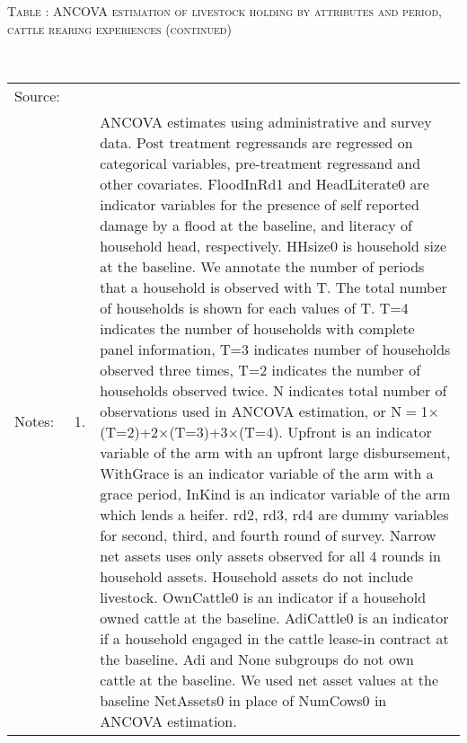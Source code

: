 \addtocounter{table}{-1}
\hspace{-1cm}\begin{minipage}[t]{14cm}
\hfil\textsc{\normalsize Table \thetable: ANCOVA estimation of livestock holding by attributes and period, cattle rearing experiences (continued)\label{tab ANCOVA livestock holding Experience timevarying attributes 2}}\\
\setlength{\tabcolsep}{1pt}
\setlength{\baselineskip}{8pt}
\renewcommand{\arraystretch}{.52}
\hfil{}\\
\renewcommand{\arraystretch}{.8}
\setlength{\tabcolsep}{1pt}
\begin{tabular}{>{\hfill\scriptsize}p{1cm}<{}>{\hfill\scriptsize}p{.25cm}<{}>{\scriptsize}p{12cm}<{\hfill}}
Source:& \multicolumn{2}{l}{\scriptsize Estimated with GUK administrative and survey data.}\\
Notes: & 1. & ANCOVA estimates using administrative and survey data. Post treatment regressands are regressed on categorical variables, pre-treatment regressand and other covariates. \textsf{FloodInRd1} and \textsf{HeadLiterate0} are indicator variables for the presence of self reported damage by a flood at the baseline, and literacy of household head, respectively. \textsf{HHsize0} is household size at the baseline. We annotate the number of periods that a household is observed with \textsf{T}. The total number of households is shown for each values of \textsf{T}. \textsf{T=4} indicates the number of households with complete panel information, \textsf{T=3} indicates number of households observed three times, \textsf{T=2} indicates the number of households observed twice. \textsf{N} indicates total number of observations used in ANCOVA estimation, or \textsf{N$=$1$\times$(T=2)+2$\times$(T=3)+3$\times$(T=4)}.  \textsf{Upfront} is an indicator variable of the arm with an upfront large disbursement, \textsf{WithGrace} is an indicator variable of the arm with a grace period, \textsf{InKind} is an indicator variable of the arm which lends a heifer. \textsf{rd2, rd3, rd4} are dummy variables for second, third, and fourth round of survey. Narrow net assets uses only assets observed for all 4 rounds in household assets. Household assets do not include livestock. \textsf{OwnCattle0} is an indicator if a household owned cattle at the baseline. \textsf{AdiCattle0} is an indicator if a household engaged in the cattle lease-in contract at the baseline.  \textsf{Adi} and \textsf{None} subgroups do not own cattle at the baseline. We used net asset values at the baseline \textsf{NetAssets0} in place of \textsf{NumCows0} in ANCOVA estimation.\\

\end{tabular}
\end{minipage}
